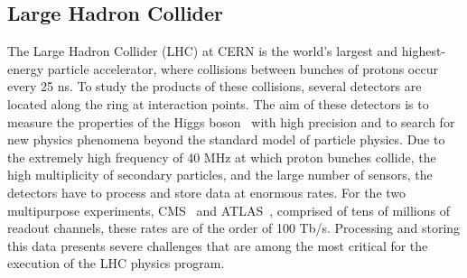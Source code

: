 
\subsection{Large Hadron Collider}

The Large Hadron Collider (LHC) at CERN is the world's largest and highest-energy particle accelerator, where collisions between bunches of protons occur every 25 ns. 
To study the products of these collisions, several detectors are located along the ring at interaction points. 
The aim of these detectors is to measure the properties of the Higgs boson~\cite{Aad:2012tfa,Chatrchyan:2012ufa} with high precision and to search for new physics phenomena beyond the standard model of particle physics.
Due to the extremely high frequency of 40 MHz at which proton bunches collide, the high multiplicity of secondary particles, and the large number of sensors, the detectors have to process and store data at enormous rates. For the two multipurpose experiments, CMS~\cite{Collaboration_2008} and ATLAS~\cite{Collaboration_2008}, comprised of tens of millions of readout channels, these rates are of the order of 100 Tb/s. 
Processing and storing this data presents severe challenges that are among the most critical for the execution of the LHC physics program. 

